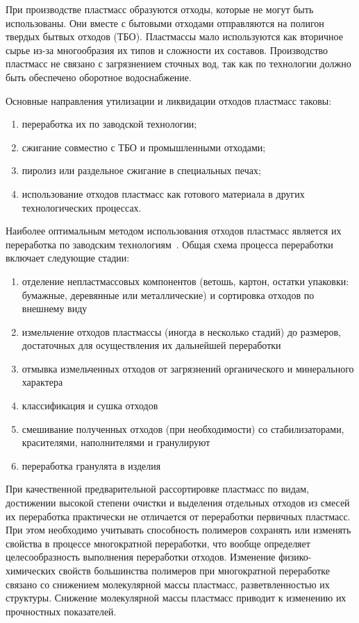 При производстве пластмасс образуются отходы, которые не могут быть
использованы. Они вместе с бытовыми отходами отправляются на полигон твердых
бытвых отходов (ТБО). Пластмассы мало используются как вторичное сырье из-за многообразия их типов
и сложности их составов. Производство пластмасс не связано с загрязнением сточных
вод, так как по технологии должно быть обеспечено оборотное водоснабжение.

Основные направления утилизации и ликвидации отходов пластмасс таковы:
\begin{enumerate}
\item переработка их по заводской технологии;
\item сжигание совместно с ТБО и промышленными отходами;
\item пиролиз или раздельное сжигание в специальных печах;
\item использование отходов пластмасс как готового материала в других технологических процессах.
\end{enumerate}

Наиболее оптимальным методом использования отходов пластмасс является их
переработка по заводским технологиям~\cite{utilization}. Общая схема процесса переработки
включает следующие стадии:
\begin{enumerate}[1.]
\item отделение непластмассовых компонентов (ветошь, картон, остатки упаковки:
	бумажные, деревянные или металлические) и сортировка отходов по внешнему виду
\item измельчение отходов пластмассы (иногда в несколько стадий) до размеров,
	достаточных для осуществления их дальнейшей переработки
\item отмывка измельченных отходов от загрязнений органического и минерального
	характера
\item классификация и сушка отходов
\item смешивание полученных отходов (при необходимости) со стабилизаторами,
	красителями, наполнителями и гранулируют
\item переработка гранулята в изделия
\end{enumerate}

При качественной предварительной рассортировке пластмасс по видам, достижении высокой
степени очистки и выделения отдельных отходов из смесей их переработка практически не
отличается от переработки первичных пластмасс. При этом необходимо учитывать способность
полимеров сохранять или изменять свойства в процессе многократной переработки, что
вообще определяет целесообразность выполнения переработки отходов. Изменение физико-химических
свойств большинства полимеров при многократной переработке связано со снижением молекулярной
массы пластмасс, разветвленностью их структуры. Снижение молекулярной массы пластмасс
приводит к изменению их прочностных показателей.

